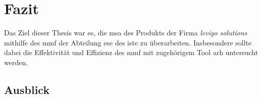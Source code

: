 \chapter{Fazit}
\label{chap:fazit}

Das Ziel dieser Thesis war es, die \acrfull{msa} des Produkts \jf der Firma \emph{levigo solutions} mithilfe des \acrfull{mmf} der Abteilung \acrfull{ese} des \acrfull{iste} zu überarbeiten.
Insbesondere sollte dabei die Effektivität und Effizienz des \gls{mmf} mit zugehörigem Tool \acrfull{arh} untersucht werden.

\section{Ausblick}